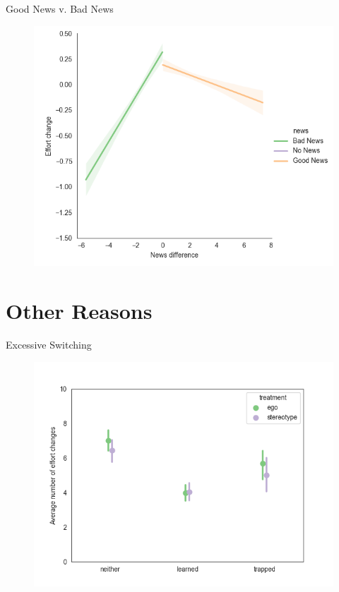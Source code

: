 \documentclass[aspectratio=169]{beamer}
\begin{document}
\begin{frame}{Good News v. Bad News}
    \label{goodvbad}
    \begin{figure}
        \centering
        \includegraphics[scale=.5]{effort_change_news.png}
    \end{figure}

\end{frame}

\section*{Other Reasons}

\begin{frame}{Excessive Switching}
    \begin{figure}
        \centering
        \includegraphics[scale=.5]{switching.png}
    \end{figure}


\end{frame}
\end{document}
